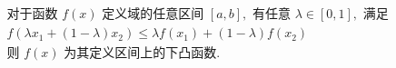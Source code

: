 \documentclass[preview]{standalone}
\begin{document}
\begin{align*}
& \text{对于函数 } f(x) \text{ 定义域的任意区间 } [a, b], \text{ 有任意 } \lambda \in [0, 1], \text{ 满足} \\ & f(\lambda x_1 + (1 - \lambda) x_2) \leq \lambda f(x_1) + (1 - \lambda) f(x_2) \\ & \text{则 } f(x) \text{ 为其定义区间上的下凸函数.}
\end{align*}
\end{document}
